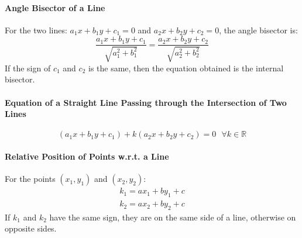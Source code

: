 \documentclass[openany, oneside]{book}
\begin{document}
\paragraph{Angle Bisector of a Line}
For the two lines: $a_1x+b_1y+c_1=0$ and $a_2x+b_2y+c_2=0$, the angle bisector is:
\begin{equation}
\dfrac{a_1x+b_1y+c_1}{\sqrt{a_1^2+b_1^2}}=\dfrac{a_2x+b_2y+c_2}{\sqrt{a_2^2+b_2^2}}
\end{equation}
If the sign of $c_1$ and $c_2$ is the same, then the equation obtained is the internal bisector.

\paragraph{Equation of a Straight Line Passing through the Intersection of Two Lines\newline}
\begin{equation}
(a_1x+b_1y+c_1)+k(a_2x+b_2y+c_2)=0\text{ }\forall k\in\mathbb{R}
\end{equation}

\paragraph{Relative Position of Points w.r.t. a Line}
For the points $(x_1,y_1)$ and $(x_2,y_2)$:
\begin{align}
k_1=ax_1+by_1+c\nonumber\\
k_2=ax_2+by_2+c\nonumber
\end{align}
If $k_1$ and $k_2$ have the same sign, they are on the same side of a line, otherwise on opposite sides.
\end{document}
